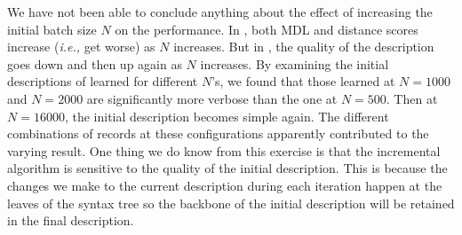 
We have not been able to conclude anything about the
effect of increasing the initial batch size $N$ on
the performance. In , both MDL and distance scores increase
({\em i.e.,} get worse) as $N$ increases. But in , the quality
of the description goes down and then up again as $N$ increases. By examining the
initial descriptions of  learned for different $N$'s,
we found that those learned at $N=1000$ and $N=2000$ are significantly more verbose than  
the one at $N=500$. Then at $N=16000$, the initial description becomes simple again.
The different combinations of records at these configurations apparently contributed to 
the varying result. One thing we do know from this exercise is that
the incremental algorithm is sensitive to the quality of the initial description.
This is because the changes we make to the current description during each iteration
happen at the leaves of the syntax tree so the backbone of the initial description
will be retained in the final description. 


